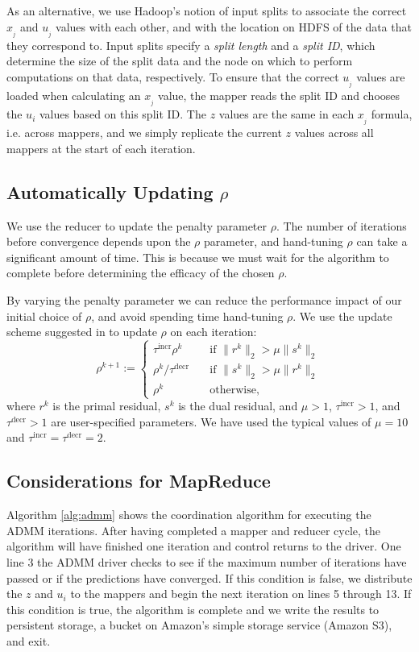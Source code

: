 \documentclass[10pt, conference, compsocconf]{IEEEtran}
\begin{document}
As an alternative, we use Hadoop's notion of input splits to associate the correct $x_{_j}$ and $u_{_j}$ values with each other, and with the location on HDFS of the data that they correspond to.  Input splits specify a \emph{split length} and a \emph{split ID}, which determine the size of the split data and the node on which to perform computations on that data, respectively.  To ensure that the correct $u_{_j}$ values are loaded when calculating an $x_{_j}$ value, the mapper reads the split ID and chooses the $u_i$ values based on this split ID.  The $z$ values are the same in each $x_{_j}$ formula, i.e. across mappers, and we simply replicate the current $z$ values across all mappers at the start of each iteration.

\subsection{Automatically Updating $\rho$}

We use the reducer to update the penalty parameter $\rho$.  The number of iterations before convergence depends upon the $\rho$ parameter, and hand-tuning $\rho$ can take a significant amount of time.  This is because we must wait for the algorithm to complete before determining the efficacy of the chosen $\rho$.

By varying the penalty parameter we can reduce the performance impact of our initial choice of $\rho$, and avoid spending time hand-tuning $\rho$.  We use the update scheme suggested in \cite{boyd} to update $\rho$ on each iteration:
\begin{equation}
\rho^{k+1}:=\begin{cases}
  \tau^{\text{incr}}\rho^k&\quad \text{if $\|r^k\|_2>\mu\|s^k\|_2$}\\
  \rho^k/\tau^{\text{decr}}&\quad \text{if $\|s^k\|_2>\mu\|r^k\|_2$}\\
  \rho^k&\quad \text{otherwise,}
\end{cases}
\label{eq:r}
\end{equation}
where $r^k$ is the primal residual, $s^k$ is the dual residual, and $\mu>1$, $\tau^{\text{incr}}>1$, and $\tau^{\text{decr}}>1$ are user-specified parameters.  We have used the typical values of $\mu=10$ and $\tau^{\text{incr}}=\tau^{\text{decr}}=2$.

\subsection{Considerations for MapReduce}
Algorithm \ref{alg:admm} shows the coordination algorithm for executing the ADMM iterations.  After having completed a mapper and reducer cycle, the algorithm will have finished one iteration and control returns to the driver.  One line 3 the ADMM driver checks to see if the maximum number of iterations have passed or if the predictions have converged.  If this condition is false, we distribute the $z$ and $u_i$ to the mappers and begin the next iteration on lines 5 through 13.  If this condition is true, the algorithm is complete and we write the results to persistent storage, a bucket on Amazon's simple storage service (Amazon S3), and exit.
\end{document}
